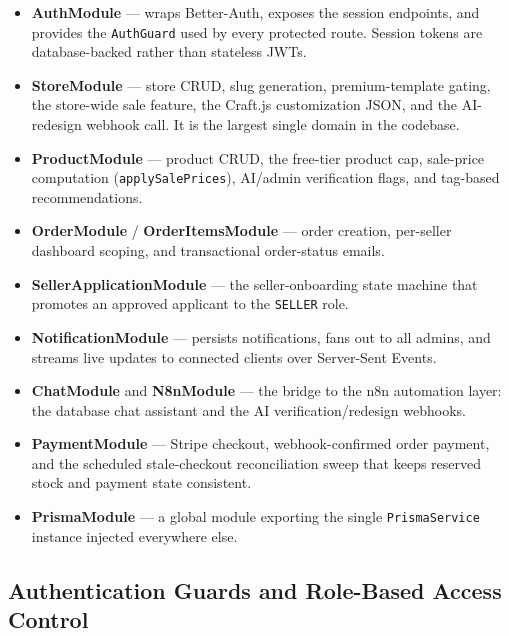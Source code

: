 \documentclass[12pt, a4paper, oneside]{report}
\begin{document}
\begin{itemize}[leftmargin=*,itemsep=3pt]
  \item \textbf{AuthModule} --- wraps Better-Auth, exposes the
        session endpoints, and provides the \texttt{AuthGuard} used
        by every protected route. Session tokens are database-backed
        rather than stateless JWTs.
  \item \textbf{StoreModule} --- store CRUD, slug generation,
        premium-template gating, the store-wide sale feature, the
        Craft.js customization JSON, and the AI-redesign webhook
        call. It is the largest single domain in the codebase.
  \item \textbf{ProductModule} --- product CRUD, the free-tier
        product cap, sale-price computation
        (\texttt{applySalePrices}), AI/admin verification flags, and
        tag-based recommendations.
  \item \textbf{OrderModule} / \textbf{OrderItemsModule} --- order
        creation, per-seller dashboard scoping, and transactional
        order-status emails.
  \item \textbf{SellerApplicationModule} --- the seller-onboarding
        state machine that promotes an approved applicant to the
        \texttt{SELLER} role.
  \item \textbf{NotificationModule} --- persists notifications,
        fans out to all admins, and streams live updates to connected
        clients over Server-Sent Events.
  \item \textbf{ChatModule} and \textbf{N8nModule} --- the bridge to
        the n8n automation layer: the database chat assistant and the
        AI verification/redesign webhooks.
  \item \textbf{PaymentModule} --- Stripe checkout, webhook-confirmed
        order payment, and the scheduled stale-checkout reconciliation
        sweep that keeps reserved stock and payment state consistent.
  \item \textbf{PrismaModule} --- a global module exporting the
        single \texttt{PrismaService} instance injected everywhere
        else.
\end{itemize}

\subsection{Authentication Guards and Role-Based Access Control}
\end{document}
